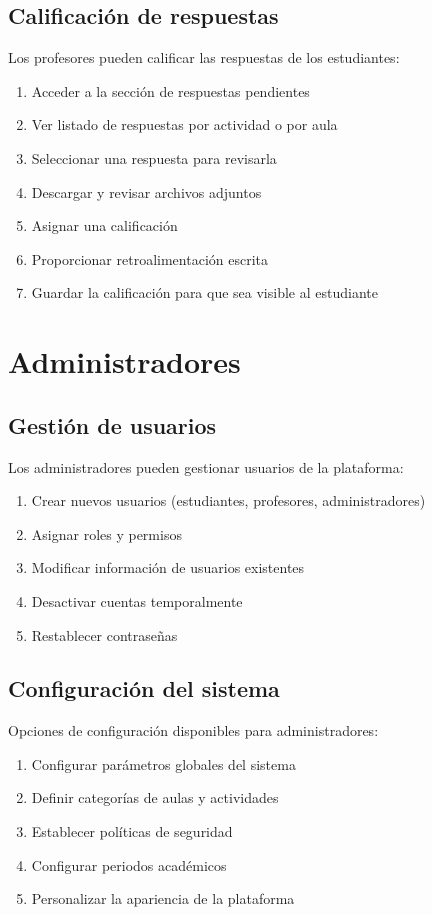 \documentclass[12pt,a4paper]{report}
\begin{document}
\subsection{Calificación de respuestas}
Los profesores pueden calificar las respuestas de los estudiantes:

\begin{enumerate}
    \item Acceder a la sección de respuestas pendientes
    \item Ver listado de respuestas por actividad o por aula
    \item Seleccionar una respuesta para revisarla
    \item Descargar y revisar archivos adjuntos
    \item Asignar una calificación
    \item Proporcionar retroalimentación escrita
    \item Guardar la calificación para que sea visible al estudiante
\end{enumerate}

\section{Administradores}
\subsection{Gestión de usuarios}
Los administradores pueden gestionar usuarios de la plataforma:

\begin{enumerate}
    \item Crear nuevos usuarios (estudiantes, profesores, administradores)
    \item Asignar roles y permisos
    \item Modificar información de usuarios existentes
    \item Desactivar cuentas temporalmente
    \item Restablecer contraseñas
\end{enumerate}

\subsection{Configuración del sistema}
Opciones de configuración disponibles para administradores:

\begin{enumerate}
    \item Configurar parámetros globales del sistema
    \item Definir categorías de aulas y actividades
    \item Establecer políticas de seguridad
    \item Configurar periodos académicos
    \item Personalizar la apariencia de la plataforma
\end{enumerate}
\end{document}
